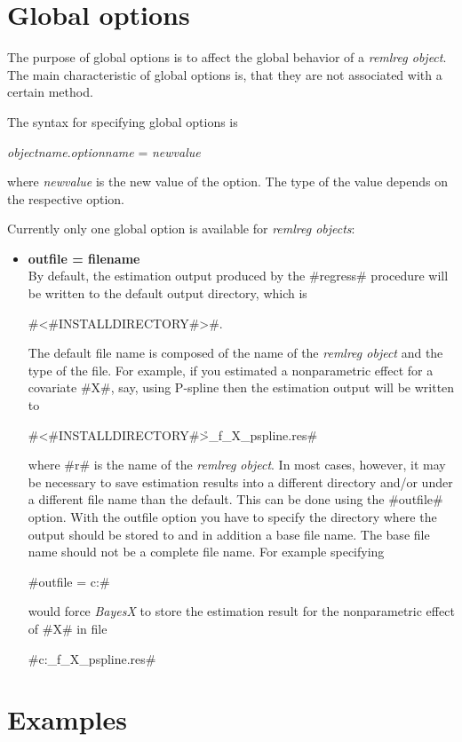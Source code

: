 \section{Global options}
\label{remlregglobopt} 

The purpose of global options is to affect the global behavior of
a {\em remlreg object}. The main characteristic of global options
is, that they are not associated with a certain method.

The syntax for specifying global options is

{\em objectname}.{\em optionname} = {\em newvalue}

where {\em newvalue} is the new value of the option. The type of
the value depends on the respective option.

Currently only one global option is available for {\em remlreg
objects}:

\begin{itemize}
\item {\bf outfile = filename} \\
By default, the estimation output produced by the #regress#
procedure will be written to the default output directory, which
is

#<#INSTALLDIRECTORY#>\output#.

The default file name is composed of the name of the {\em remlreg
object} and the type of the file. For example, if you estimated a
nonparametric effect for a covariate #X#, say, using P-spline then
the estimation output will be written to

#<#INSTALLDIRECTORY#>\output\r_f_X_pspline.res#

where #r# is the name of the {\em remlreg object}. In most cases,
however, it may be necessary to save estimation results into a
different directory and/or under a different file name than the
default. This can be done using the #outfile# option. With the
outfile option you have to specify the directory where the output
should be stored to and in addition a base file name. The base
file name should not be a complete file name. For example specifying

#outfile = c:\data{}#

would force {\em BayesX} to store the estimation result for the
nonparametric effect of #X# in file

#c:\data{}_f_X_pspline.res#
\end{itemize}

\section{Examples}
\label{remlregexamples}

